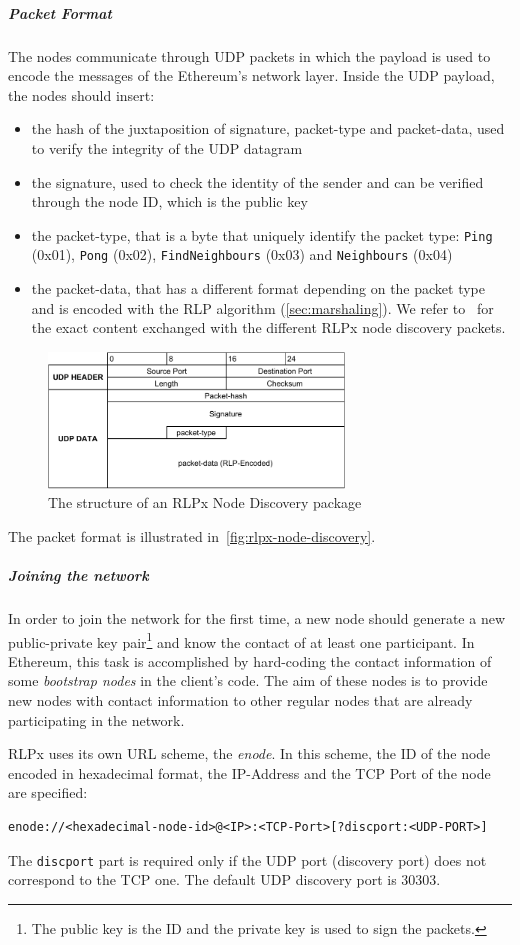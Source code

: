 \subparagraph{Packet Format}
The nodes communicate through UDP packets in which the payload is used to encode
the messages of the Ethereum's network layer. Inside the UDP payload, the nodes
should insert:
\begin{itemize}
    \item the hash of the juxtaposition of signature, packet-type and
    packet-data, used to verify the integrity of the UDP datagram
    \item the signature, used to check the identity of the sender and can be
    verified through the node ID, which is the public key
    \item the packet-type, that is a byte that uniquely identify the packet
    type: \texttt{Ping} (0x01), \texttt{Pong} (0x02), \texttt{FindNeighbours}
    (0x03) and \texttt{Neighbours} (0x04)~\cite{bib:rlpx-discovery-protocol}
    \item the packet-data, that has a different format depending on the packet
    type and is encoded with the RLP algorithm (\autoref{sec:marshaling}). We
    refer to~\cite{bib:rlpx-discovery-protocol} for the exact content exchanged
    with the different RLPx node discovery packets.
\end{itemize}
\begin{figure}
    \begin{center}
    \includegraphics[width=0.7\textwidth]{./res/img/rlp-node-discovery-packet-format.pdf}
    \caption{The structure of an RLPx Node Discovery package}
    \label{fig:rlpx-node-discovery}
    \end{center}
\end{figure}

The packet format is illustrated in~\autoref{fig:rlpx-node-discovery}.


\subparagraph{Joining the network}
In order to join the network for the first time, a new node should generate a
new public-private key pair\footnote{The public key is the ID and the private
key is used to sign the packets.} and know the contact of at least one
participant. In Ethereum, this task is accomplished by hard-coding the contact
information of some \textit{bootstrap nodes} in the client's code. The aim of
these nodes is to provide new nodes with contact information to other regular
nodes that are already participating in the network.

RLPx uses its own URL scheme, the \emph{enode}. In this scheme, the ID of the
node encoded in hexadecimal format, the IP-Address and the TCP Port of the node
are specified:
\begin{verbatim}
enode://<hexadecimal-node-id>@<IP>:<TCP-Port>[?discport:<UDP-PORT>]
\end{verbatim}
The \verb|discport| part is required only if the UDP port (discovery port) does
not correspond to the TCP one. The default UDP discovery port is 30303.
